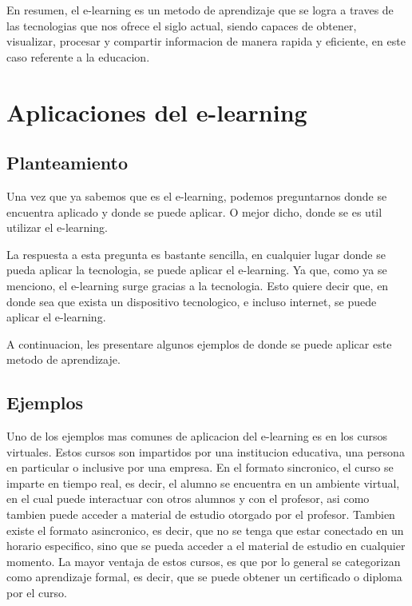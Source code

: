 En resumen, el e-learning es un metodo de aprendizaje que se logra a traves
de las tecnologias que nos ofrece el siglo actual, siendo capaces de obtener,
visualizar, procesar y compartir informacion de manera rapida y eficiente, en 
este caso referente a la educacion.

\section{Aplicaciones del e-learning}

\subsection{Planteamiento}

Una vez que ya sabemos que es el e-learning, podemos preguntarnos donde se 
encuentra aplicado y donde se puede aplicar. O mejor dicho, donde se es util 
utilizar el e-learning.

La respuesta a esta pregunta es bastante sencilla, en cualquier lugar donde 
se pueda aplicar la tecnologia, se puede aplicar el e-learning. Ya que, como 
ya se menciono, el e-learning surge gracias a la tecnologia. Esto quiere decir 
que, en donde sea que exista un dispositivo tecnologico, e incluso internet,
se puede aplicar el e-learning.

A continuacion, les presentare algunos ejemplos de donde se puede aplicar este 
metodo de aprendizaje.

\subsection{Ejemplos}

Uno de los ejemplos mas comunes de aplicacion del e-learning es en los 
cursos virtuales. Estos cursos son impartidos por una institucion educativa, 
una persona en particular o inclusive por una empresa. 
En el formato sincronico, el curso se imparte en tiempo real, es decir, el alumno 
se encuentra en un ambiente virtual, en el cual puede interactuar con otros 
alumnos y con el profesor, asi como tambien puede acceder a material de estudio 
otorgado por el profesor. 
Tambien existe el formato asincronico, es decir, que no se tenga que estar 
conectado en un horario especifico, sino que se pueda acceder a el material de 
estudio en cualquier momento.
La mayor ventaja de estos cursos, es que por lo general se categorizan como 
aprendizaje formal, es decir, que se puede obtener un certificado o diploma por 
el curso.

